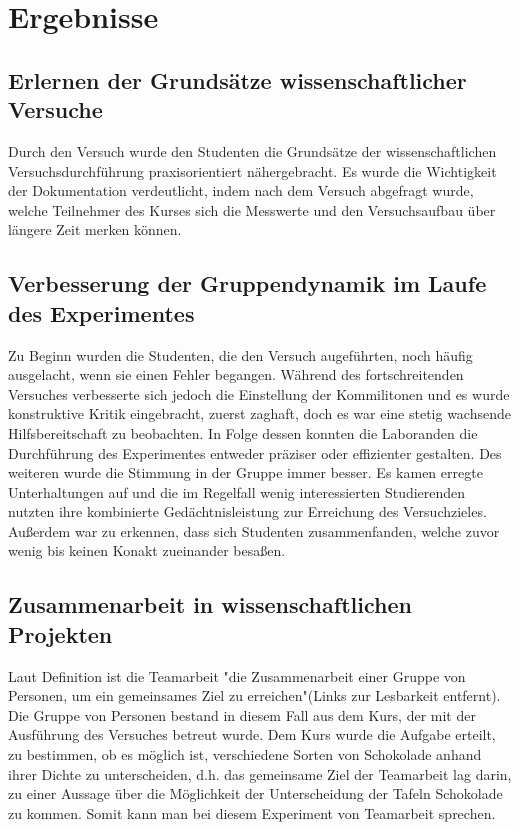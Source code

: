 \documentclass{article}
\begin{document}
\section{Ergebnisse}
\subsection{Erlernen der Grundsätze wissenschaftlicher Versuche}
Durch den Versuch wurde den Studenten die Grundsätze der wissenschaftlichen Versuchsdurchführung praxisorientiert nähergebracht. Es wurde die Wichtigkeit der Dokumentation verdeutlicht, indem nach dem Versuch abgefragt wurde, welche Teilnehmer des Kurses sich die Messwerte und den Versuchsaufbau über längere Zeit merken können.
\subsection{Verbesserung der Gruppendynamik im Laufe des Experimentes}
Zu Beginn wurden die Studenten, die den Versuch augeführten, noch häufig ausgelacht, wenn sie einen Fehler begangen. Während des fortschreitenden Versuches verbesserte sich jedoch die Einstellung der Kommilitonen und es wurde konstruktive Kritik eingebracht, zuerst zaghaft, doch es war eine stetig wachsende Hilfsbereitschaft zu beobachten. In Folge dessen konnten die Laboranden die Durchführung des Experimentes entweder präziser oder effizienter gestalten. Des weiteren wurde die Stimmung in der Gruppe immer besser. Es kamen erregte Unterhaltungen auf und die im Regelfall wenig interessierten Studierenden nutzten ihre kombinierte Gedächtnisleistung zur Erreichung des Versuchzieles. Außerdem war zu erkennen, dass sich Studenten zusammenfanden, welche zuvor wenig bis keinen Konakt zueinander besaßen.
\subsection{Zusammenarbeit in wissenschaftlichen Projekten}
Laut Definition ist die Teamarbeit "die Zusammenarbeit einer Gruppe von Personen, um ein gemeinsames Ziel zu erreichen"(Links zur Lesbarkeit entfernt). Die Gruppe von Personen bestand in diesem Fall aus dem Kurs, der mit der Ausführung des Versuches betreut wurde. Dem Kurs wurde die Aufgabe erteilt, zu bestimmen, ob es möglich ist, verschiedene Sorten von Schokolade anhand ihrer Dichte zu unterscheiden, d.h. das gemeinsame Ziel der Teamarbeit lag darin, zu einer Aussage über die Möglichkeit der Unterscheidung der Tafeln Schokolade zu kommen. Somit kann man bei diesem Experiment von Teamarbeit sprechen.
\end{document}
